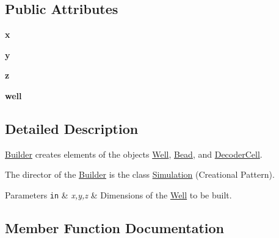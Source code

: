 \subsection*{Public Attributes}
\begin{DoxyCompactItemize}
\item 
\mbox{\label{class_c_c_p___hannes_1_1_builder_a51d328b6af6e0fb918f16dce16e32138}} 
{\bfseries x}
\item 
\mbox{\label{class_c_c_p___hannes_1_1_builder_a77b97e64bc2de9a587863263b4e2497d}} 
{\bfseries y}
\item 
\mbox{\label{class_c_c_p___hannes_1_1_builder_a3d33e45accca50760fbc8a23cb8578de}} 
{\bfseries z}
\item 
\mbox{\label{class_c_c_p___hannes_1_1_builder_ab0c32a1f39454bb20e1cedde5a3597f4}} 
{\bfseries well}
\end{DoxyCompactItemize}


\subsection{Detailed Description}
\mbox{\hyperlink{class_c_c_p___hannes_1_1_builder}{Builder}} creates elements of the objects \mbox{\hyperlink{class_c_c_p___hannes_1_1_well}{Well}}, \mbox{\hyperlink{class_c_c_p___hannes_1_1_bead}{Bead}}, and \mbox{\hyperlink{class_c_c_p___hannes_1_1_decoder_cell}{Decoder\+Cell}}. 

The director of the \mbox{\hyperlink{class_c_c_p___hannes_1_1_builder}{Builder}} is the class \mbox{\hyperlink{class_c_c_p___hannes_1_1_simulation}{Simulation}} (Creational Pattern).


\begin{DoxyParams}[1]{Parameters}
\mbox{\tt in}  & {\em x,y,z} & Dimensions of the \mbox{\hyperlink{class_c_c_p___hannes_1_1_well}{Well}} to be built. \\
\hline
\end{DoxyParams}


\subsection{Member Function Documentation}
\mbox{\label{class_c_c_p___hannes_1_1_builder_aecc5d7647ff893b666d0041008b496fd}} 
